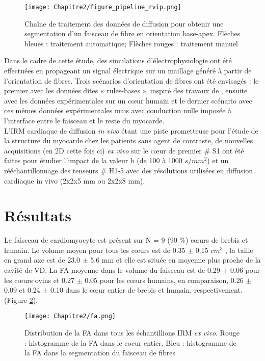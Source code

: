 \begin{figure}[!ht]
  \begin{center}
    \texttt{[image: Chapitre2/figure\_pipeline\_rvip.png]}
  \end{center}
  \caption{Chaîne de traitement des données de diffusion pour obtenir une segmentation d'un faisceau de fibre en orientation base-apex. Flèches bleues : traitement automatique; Flèches rouges : traitement manuel}
  \label{fig:pipeline}
\end{figure}

Dans le cadre de cette étude, des simulations d’électrophysiologie ont été effectuées en propageant un signal électrique sur un maillage généré à partir de l’orientation de fibres. Trois scénarios d’orientation de fibres ont été envisagés : le premier avec les données dites « rules-bases », inspiré des travaux de \cite{Bayer2012}, ensuite avec les données expérimentales sur un cœur humain et le dernier scénario avec ces mêmes données expérimentales mais avec conduction nulle imposée à l’interface entre le faisceau et le reste du myocarde. 
\\
L’IRM cardiaque de diffusion \textit{in vivo} étant une piste prometteuse pour l’étude de la structure du myocarde chez les patients sans agent de contraste, de nouvelles acquisitions (en 2D cette fois ci) \textit{ex vivo} sur le cœur de premier $\#$ S1 ont été faites pour étudier l’impact de la valeur b (de 100 à 1000 $s/mm^2$) et un rééchantillonnage des tenseurs $\#$ H1-5 avec des résolutions utilisées en diffusion cardiaque in vivo (2x2x5 mm ou 2x2x8 mm).
\clearpage
\section{Résultats}

Le faisceau de cardiomyocyte est présent sur N = 9 (90 $ \% $) cœurs de brebis et humain. Le volume moyen pour tous les cœurs est de 0.35 $\pm$ 0.15 $cm^3$ , la taille en grand axe est de 23.0 $\pm$ 5.6 mm et elle est située en moyenne plus proche de la cavité de VD. La FA moyenne dans le volume du faisceau est de 0.29 $\pm $ 0.06 pour les cœurs ovins et 0.27 $\pm$ 0.05 pour les cœurs humains, en comparaison, 0.26 $\pm$ 0.09 et 0.24 $\pm$ 0.10 dans le cœur entier de brebis et humain, respectivement. (Figure \ref{fig:FA}).

\begin{figure}[!ht]
  \begin{center}
    \texttt{[image: Chapitre2/fa.png]}
  \end{center}
  \caption{Distribution de la FA dans tous les échantillions IRM \textit{ex vivo}. Rouge : histogramme de la FA dans le coeur entier. Bleu : histogramme de la FA dans la segmentation du faisceau de fibres}
  \label{fig:FA}
\end{figure}


